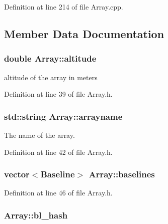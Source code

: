 Definition at line 214 of file Array.cpp.



\subsection{Member Data Documentation}
\hypertarget{classArray_a07662f84d93f59a30c9312b6b546ee39}{
\subsubsection[{altitude}]{\setlength{\rightskip}{0pt plus 5cm}double {\bf Array::altitude}}}
\label{classArray_a07662f84d93f59a30c9312b6b546ee39}


altitude of the array in meters 



Definition at line 39 of file Array.h.

\hypertarget{classArray_a12eb22fefdce3d4ae71d0340717c293a}{
\subsubsection[{arrayname}]{\setlength{\rightskip}{0pt plus 5cm}std::string {\bf Array::arrayname}}}
\label{classArray_a12eb22fefdce3d4ae71d0340717c293a}


The name of the array. 



Definition at line 42 of file Array.h.

\hypertarget{classArray_af43b2ed14c631c015a47b7e453ceec6d}{
\subsubsection[{baselines}]{\setlength{\rightskip}{0pt plus 5cm}vector$<${\bf Baseline}$>$ {\bf Array::baselines}}}
\label{classArray_af43b2ed14c631c015a47b7e453ceec6d}


Definition at line 46 of file Array.h.

\hypertarget{classArray_a288cf9eaad2011bd6ea76acbb08ed1ed}{
\subsubsection[{bl\_\-hash}]{ {\bf Array::bl\_\-hash}}}
\label{classArray_a288cf9eaad2011bd6ea76acbb08ed1ed}


